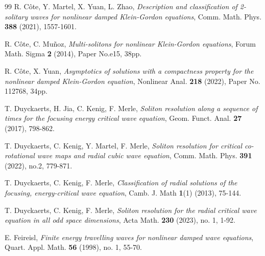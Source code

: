 \documentclass[reqno]{amsart}
\theoremstyle{plain}
\theoremstyle{definition}
\numberwithin{equation}{section}
\newcommand{\1}{\mathbbm{1}}
\begin{document}
\begin{thebibliography}{99}
 R. C\^{o}te, Y. Martel, X. Yuan, L. Zhao,
\textit{Description and classification of 2-solitary waves for nonlinear damped Klein-Gordon equations},
Comm. Math. Phys. \textbf{388} (2021), 1557-1601.



 R. C\^{o}te, C. Mu\~{n}oz,
\textit{Multi-solitons for nonlinear Klein-Gordon equations},
Forum Math. Sigma \textbf{2} (2014), Paper No.e15, 38pp.



 R. C\^{o}te, X. Yuan,
\textit{Asymptotics of solutions with a compactness property for the nonlinear damped Klein-Gordon equation},
Nonlinear Anal. \textbf{218} (2022), Paper No. 112768, 34pp.

 T. Duyckaerts, H. Jia, C. Kenig, F. Merle,
\textit{Soliton resolution along a sequence of times for the focusing energy critical wave equation},
Geom. Funct. Anal. \textbf{27} (2017), 798-862.

 T. Duyckaerts, C. Kenig, Y. Martel, F. Merle,
\textit{Soliton resolution for critical co-rotational wave maps and radial cubic wave equation},
Comm. Math. Phys. \textbf{391} (2022), no.2, 779-871.


 T. Duyckaerts, C. Kenig, F. Merle,
\textit{Classification of radial solutions of the focusing, energy-critical wave equation},
Camb. J. Math \textbf{1}(1) (2013), 75-144.



 T. Duyckaerts, C. Kenig, F. Merle,
\textit{Soliton resolution for the radial critical wave equation in all odd space dimensions},
Acta Math. \textbf{230} (2023), no. 1, 1-92.



 E. Feireisl,
\textit{Finite energy travelling waves for nonlinear damped wave equations},
Quart. Appl. Math. \textbf{56} (1998), no. 1, 55-70.



\end{thebibliography}
\end{document}
